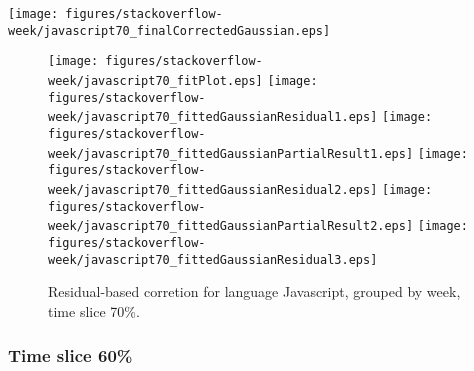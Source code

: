 \begin{center}
{\texttt{[image: figures/stackoverflow-week/javascript70\_finalCorrectedGaussian.eps]}}
\end{center}

\FloatBarrier

\begin{figure}[t]
\centering
{}
{\texttt{[image: figures/stackoverflow-week/javascript70\_fitPlot.eps]}}
{\texttt{[image: figures/stackoverflow-week/javascript70\_fittedGaussianResidual1.eps]}}
{\texttt{[image: figures/stackoverflow-week/javascript70\_fittedGaussianPartialResult1.eps]}}
{\texttt{[image: figures/stackoverflow-week/javascript70\_fittedGaussianResidual2.eps]}}
{\texttt{[image: figures/stackoverflow-week/javascript70\_fittedGaussianPartialResult2.eps]}}
{\texttt{[image: figures/stackoverflow-week/javascript70\_fittedGaussianResidual3.eps]}}
\caption{Residual-based corretion for language Javascript, grouped by week, time slice 70\%.}
\end{figure}


\FloatBarrier


\subsubsection{Time slice 60\%}

